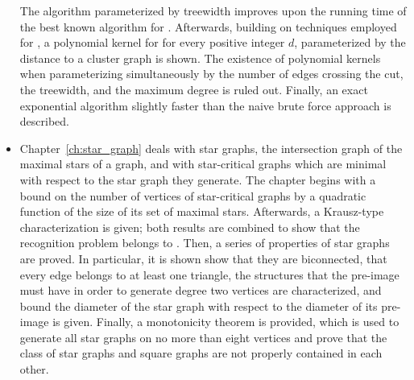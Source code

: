 \begin{itemize}
    The algorithm parameterized by treewidth improves upon the running time of the best known algorithm for .
    Afterwards, building on techniques employed for , a polynomial kernel for  for every positive integer $d$, parameterized by the distance to a cluster graph is shown.
    The existence of polynomial kernels when parameterizing simultaneously by the number of edges crossing the cut, the treewidth, and the maximum degree is ruled out.
    Finally, an exact exponential algorithm slightly faster than the naive brute force approach is described.
    \item Chapter~\ref{ch:star_graph} deals with star graphs, the intersection graph of the maximal stars of a graph, and with star-critical graphs which are minimal with respect to the star graph they generate.
    The chapter begins with a bound on the number of vertices of star-critical graphs by a quadratic function of the size of its set of maximal stars.
    Afterwards, a Krausz-type characterization is given; both results are combined to show that the recognition problem belongs to \NP.
    Then, a series of properties of star graphs are proved.
    In particular, it is shown show that they are biconnected, that every edge belongs to at least one triangle, the structures that the pre-image must have in order to generate degree two vertices are characterized, and bound the diameter of the star graph with respect to the diameter of its pre-image is given.
    Finally, a monotonicity theorem is provided, which is used to generate all star graphs on no more than eight vertices and prove that the class of star graphs and square graphs are not properly contained in each other.
\end{itemize}

